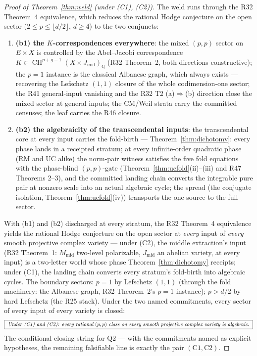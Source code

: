 \documentclass[11pt]{article}
\newcommand{\Q}{\mathbb Q}
\newcommand{\CH}{\operatorname{CH}}
\begin{document}
\begin{proof}[Proof of Theorem~\ref{thm:weld} (under (C1), (C2))]
The weld runs through the R32 Theorem~4 equivalence, which reduces
the rational Hodge conjecture on the open sector
($2\le p\le\lfloor d/2\rfloor$, $d\ge4$) to the two conjuncts:
\begin{enumerate}[label=(\alph*)]
\item \textbf{(b1) the $K$-correspondences everywhere}: the mixed
$(p,p)$ sector on $E\times X$ is controlled by the Abel--Jacobi
correspondence $K\in\CH^{p+g-1}(X\times J_{\mathrm{mid}})_\Q$ (R32
Theorem~2, both directions constructive); the $p=1$ instance is the
classical Albanese graph, which always exists --- recovering the
Lefschetz $(1,1)$ closure of the whole codimension-one sector; the
R41 general-input vanishing and the R32 T2 (a)$\Rightarrow$(b)
direction close the mixed sector at general inputs; the CM/Weil
strata carry the committed censuses; the leaf carries the R46
closure.
\item \textbf{(b2) the algebraicity of the transcendental inputs}:
the transcendental core at every input carries the fold-birth ---
Theorem~\ref{thm:dichotomy}: every phase lands in a receipted
stratum; at every infinite-order quadratic phase (RM and UC alike)
the norm-pair witness satisfies the five fold equations with the
phase-blind $(p,p)$-gate (Theorem~\ref{thm:ucfold}(ii)--(iii) and
R47 Theorems 2--3), and the committed landing chain converts the
integrable pure pair at nonzero scale into an actual algebraic
cycle; the spread (the conjugate isolation,
Theorem~\ref{thm:ucfold}(iv)) transports the one source to the full
sector.
\end{enumerate}
With (b1) and (b2) discharged at every stratum, the R32 Theorem~4
equivalence yields the rational Hodge conjecture on the open sector
at \emph{every} input of \emph{every} smooth projective complex
variety --- under (C2), the middle extraction's input (R32
Theorem~1: $M_{\mathrm{mid}}$ two-level polarizable,
$J_{\mathrm{mid}}$ an abelian variety, at every input) is a
two-letter world whose phase Theorem~\ref{thm:dichotomy} receipts;
under (C1), the landing chain converts every stratum's fold-birth
into algebraic cycles. The boundary sectors: $p=1$ by Lefschetz
$(1,1)$ (through the fold machinery: the Albanese graph, R32
Theorem~2's $p=1$ instance); $p>d/2$ by hard Lefschetz (the R25
stack). Under the two named commitments, every sector of every input
of every variety is closed:
\[
\boxed{\ \text{\emph{Under (C1) and (C2): every rational $(p,p)$
class on every smooth projective complex variety is algebraic.}}\ }
\]
The conditional closing string for $\mathrm{Q2}$ --- with the
commitments named as explicit hypotheses, the remaining falsifiable
line is exactly the pair $(\mathrm{C1},\mathrm{C2})$.
\end{proof}
\end{document}
